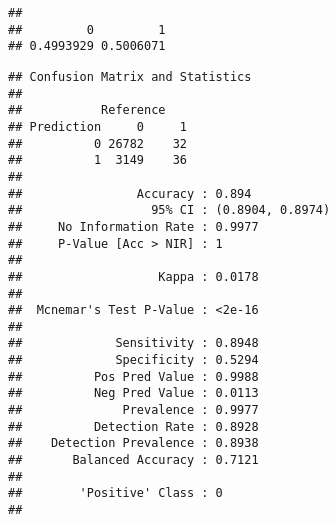 \documentclass[]{article}
\newenvironment{Shaded}{\begin{snugshade}}{\end{snugshade}}
\newcommand{\CommentTok}[1]{\textcolor[rgb]{0.56,0.35,0.01}{\textit{#1}}}
\newcommand{\DataTypeTok}[1]{\textcolor[rgb]{0.13,0.29,0.53}{#1}}
\newcommand{\KeywordTok}[1]{\textcolor[rgb]{0.13,0.29,0.53}{\textbf{#1}}}
\newcommand{\NormalTok}[1]{#1}
\newcommand{\OperatorTok}[1]{\textcolor[rgb]{0.81,0.36,0.00}{\textbf{#1}}}
\newcommand{\StringTok}[1]{\textcolor[rgb]{0.31,0.60,0.02}{#1}}
\begin{document}
\begin{Shaded}
\end{Shaded}

\begin{verbatim}
## 
##         0         1 
## 0.4993929 0.5006071
\end{verbatim}

\begin{Shaded}
\end{Shaded}

\begin{verbatim}
## Confusion Matrix and Statistics
## 
##           Reference
## Prediction     0     1
##          0 26782    32
##          1  3149    36
##                                           
##                Accuracy : 0.894           
##                  95% CI : (0.8904, 0.8974)
##     No Information Rate : 0.9977          
##     P-Value [Acc > NIR] : 1               
##                                           
##                   Kappa : 0.0178          
##                                           
##  Mcnemar's Test P-Value : <2e-16          
##                                           
##             Sensitivity : 0.8948          
##             Specificity : 0.5294          
##          Pos Pred Value : 0.9988          
##          Neg Pred Value : 0.0113          
##              Prevalence : 0.9977          
##          Detection Rate : 0.8928          
##    Detection Prevalence : 0.8938          
##       Balanced Accuracy : 0.7121          
##                                           
##        'Positive' Class : 0               
## 
\end{verbatim}

\begin{Shaded}
\end{Shaded}
\end{document}
